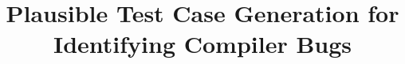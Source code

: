 



\title{Plausible Test Case Generation for Identifying Compiler Bugs}

\maketitle















\printbibliography

